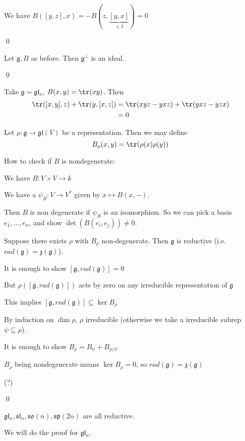 \documentclass[x11names,reqno,14pt]{extarticle}
\newcommand{\mk}[1]{\mathfrak{#1}}
\newcommand{\g}{\mk{g}}
\newcommand{\so}{\mk{s}\mk{o}}
\newcommand{\rad}{rad}
\renewcommand{\sp}{\mk{s}\mk{p}}
\newcommand{\gl}{\mk{g}\mk{l}}
\renewcommand{\sl}{\mk{s}\mk{l}}
\begin{document}
We have $B([y,z],x) = -B(z,\underbrace{[y,x]}_{\in I}) = 0$

\qed

\cor

Let $\g, B$ as before. Then $\g^\perp$ is an ideal. 

\qed

\exm

Take $\g = \gl_n$, $B(x,y) = \tr(xy)$. Then 
\begin{align*}
\tr([x,y],z) + \tr(y,[x,z]) & = \tr(xyz - yxz) + \tr(yxz - yzx) \\
& = 0
\end{align*}

\exm

Let $\rho:\g\to\gl(V)$ be a representation. Then we may define
\[
B_\rho(x,y) = \tr(\rho(x)\rho(y))
\]

How to check if $B$ is nondegenerate:

We have $B:V\times V \to k$

We have a $\psi_B:V \to V^*$ given by $x\mapsto B(x,-)$.

Then $B$ is non degenerate if $\psi_B$ is an isomorphism. So we can pick a basis $e_1,\dots,e_n$, and show $\det(B(e_i,e_j)) \neq 0$.

\thm

Suppose there exists $\rho$ with $B_\rho$ non-degenerate. Then $\g$ is reductive (i.e. $\rad(\g) = \mk{z}(\g)$).

\proof

It is enough to show $[\g,\rad(\g)] = 0$

But $\rho([\g,\rad(\g)])$ acts by zero on any irreducible representation of $\g$

\claim

This implies $[\g,\rad(\g)] \subseteq \ker B_\rho$

\proof

By induction on $\dim \rho$, $\rho$ irreducible (otherwise we take a irreducible subrep $\psi\subseteq\rho$). 

It is enough to show $B_\rho = B_\psi + B_{\rho/\psi}$

$B_\rho$ being nondegenerate means $\ker B_\rho = 0$, so $\rad(\g) = \mk{z}(\g)$ 

(?)

\qed

\cor

$\gl_n,\sl_n,\so(n),\sp(2n)$ are all reductive. 

\proof

We will do the proof for $\gl_n$. 
\end{document}
